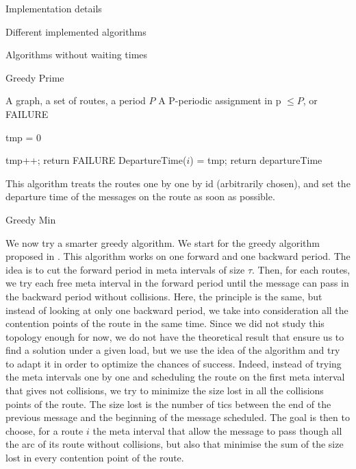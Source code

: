 \documentclass[10pt]{article}
\begin{document}
\begin{section}{Implementation details}
\begin{subsection}{Different implemented algorithms}
\begin{subsection}{Algorithms without waiting times}
\begin{subsubsection}{Greedy Prime}
   	\begin{algorithm}[H]
 	\caption{Greedy Prime}
 	\begin{algorithmic}
 	\REQUIRE A graph, a set of routes, a period $P$
	\ENSURE A P-periodic assignment in p $\leq P$, or FAILURE

	\STATE tmp = $0$
	
 	
 	\STATE tmp++;
	\STATE return FAILURE
	\ENDIF
 	\ENDWHILE
	\STATE DepartureTime($i$) = tmp;
 	\ENDFOR
	\STATE return departureTime
 	\end{algorithmic}
 	\end{algorithm}
	This algorithm treats the routes one by one by id (arbitrarily chosen), and set the departure time of the messages on the route as soon as possible.
  \end{subsubsection}
    \begin{subsubsection}{Greedy Min}
  
  We now try a smarter greedy algorithm. We start for the greedy algorithm proposed in \cite{Guir1806:Deterministic}.
  This algorithm works on one forward and one backward period. The idea is to cut the forward period in meta intervals of size $\tau$. Then, for each routes, we try each free meta interval in the forward period until the message can pass in the backward period without collisions. Here, the principle is the same, but instead of looking at only one backward period, we take into consideration all the contention points of the route in the same time. Since we did not study this topology enough for now, we do not have the theoretical result that ensure us to find a solution under a given load, but we use the idea of the algorithm and try to adapt it in order to optimize the chances of success. Indeed, instead of trying the meta intervals one by one and scheduling the route on the first meta interval that gives not collisions, we try to minimize the size lost in all the collisions points of the route.
 	The size lost is the number of tics between the end of the previous message and the beginning of the message scheduled.
	The goal is then to choose, for a route $i$ the meta interval that allow the message to pass though all the arc of its route without collisions, but also that minimise the sum of the size lost in every contention point of the route.
	

\end{subsubsection}
\end{subsection}
\end{subsection}
\end{section}
\end{document}
